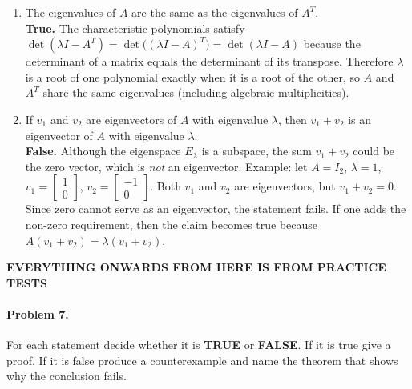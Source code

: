 \documentclass{article}
\begin{document}
\begin{multicols*}{2}
\begin{enumerate}[label=(\alph*)]
    \item The eigenvalues of $A$ are the same as the eigenvalues of $A^{T}$.\\[2pt]
    \textbf{True.}\;  
    The characteristic polynomials satisfy
    $
    \det(\lambda I - A^{T}) = \det\!\bigl((\lambda I - A)^{T}\bigr)
            = \det(\lambda I - A)
    $
    because the determinant of a matrix equals the determinant of its transpose.  
    Therefore $\lambda$ is a root of one polynomial exactly when it is a root of the other, so $A$ and $A^{T}$ share the same eigenvalues (including algebraic multiplicities).
    
    \item If $v_{1}$ and $v_{2}$ are eigenvectors of $A$ with eigenvalue $\lambda$, then $v_{1}+v_{2}$ is an eigenvector of $A$ with eigenvalue $\lambda$.\\[2pt]
    \textbf{False.}\;  
    Although the eigenspace $E_{\lambda}$ is a subspace, the sum $v_{1}+v_{2}$ could be the zero vector, which is \emph{not} an eigenvector.  
    Example: let $A = I_2$, $\lambda = 1$, $v_{1} = \begin{bmatrix}1\\0\end{bmatrix}$, $v_{2} = \begin{bmatrix}-1\\0\end{bmatrix}$.  
    Both $v_{1}$ and $v_{2}$ are eigenvectors, but $v_{1}+v_{2}=0$.  
    Since zero cannot serve as an eigenvector, the statement fails.
    If one adds the non-zero requirement, then the claim becomes true because $A(v_{1}+v_{2}) = \lambda(v_{1}+v_{2})$.
    \end{enumerate}
\textbf{EVERYTHING ONWARDS FROM HERE IS FROM PRACTICE TESTS}

\paragraph{Problem 7.}
For each statement decide whether it is \textbf{TRUE} or \textbf{FALSE}.  
If it is true give a proof.  
If it is false produce a counterexample and name the theorem that shows why the conclusion fails.


\end{multicols*}
\end{document}
